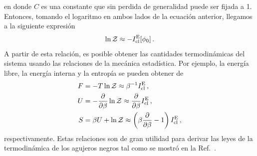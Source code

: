 \documentclass[../Main.tex]{subfiles}
\begin{document}
en donde $C$ es una constante que sin perdida de generalidad puede ser fijada a 1. Entonces, tomando el logaritmo en ambos lados de la ecuación anterior, llegamos a la siguiente expresión 
\begin{equation}
 \ln \mathcal{Z} \approx -I^{\rm E}_{\rm cl}[\phi_{0}]\, .
\end{equation}
A partir de esta relación, es posible obtener las cantidades termodinámicas del sistema usando las relaciones de la mecánica estadística. Por ejemplo, la energía libre, la energía interna y la entropía se pueden obtener de
\begin{align}\label{free}
    F&=-T\ln\mathcal{Z}\approx\beta^{-1}I^{\rm E}_{\rm cl}\, ,\\ 
    U&=-\frac{\partial}{\partial\beta}\ln\mathcal{Z}\approx\frac{\partial}{\partial\beta}I^{\rm E}_{\rm cl} \label{internal}\, ,\\ 
    S&=\beta U+\ln\mathcal{Z}\approx\left(\beta\frac{\partial}{\partial\beta}-1\right)I^{\rm E}_{\rm cl}\label{entropy1}\, ,
\end{align}
respectivamente. Estas relaciones son de gran utilidad para derivar las leyes de la termodinámica de los agujeros negros tal como se mostró en la Ref.~\cite{Gibbons:1976ue}.
\end{document}

